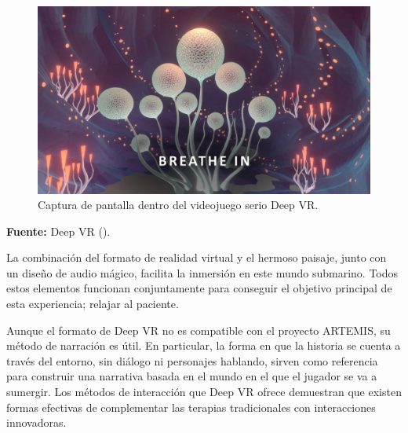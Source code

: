 \begin{figure}[h!]
	\centering
	\includegraphics[width=0.8\linewidth]{Figuras/Estado/DeepVR.jpg}
	\caption{Captura de pantalla dentro del videojuego serio Deep VR.}
	\label{fig:DeepVR}
	\vspace{-30pt}
\end{figure}

\begin{center}
	\textbf{Fuente:} Deep VR (\citeyear{DEEP:2021}).

\end{center}

La combinación del formato de realidad virtual y el hermoso paisaje, junto con un diseño de audio mágico, facilita la inmersión en este mundo submarino. Todos estos elementos funcionan conjuntamente para conseguir el objetivo principal de esta experiencia; relajar al paciente.

Aunque el formato de Deep VR no es compatible con el proyecto ARTEMIS, su método de narración es útil. En particular, la forma en que la historia se cuenta a través del entorno, sin diálogo ni personajes hablando, sirven como referencia para construir una narrativa basada en el mundo en el que el jugador se va a sumergir. Los métodos de interacción que Deep VR ofrece demuestran que existen formas efectivas de complementar las terapias tradicionales con interacciones innovadoras.